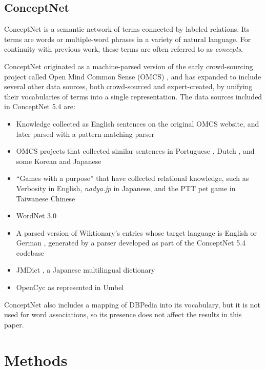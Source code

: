 \documentclass[letterpaper]{article}
\begin{document}
\subsection{ConceptNet}
ConceptNet \cite{speer2012conceptnet} is a semantic network of terms
connected by labeled relations. Its terms are words or multiple-word phrases
in a variety of natural language. For continuity with previous work,
these terms are often referred to as {\em concepts}.

ConceptNet originated as a machine-parsed version of the early crowd-sourcing
project called Open Mind Common Sense (OMCS) \cite{singh2002omcs}, and has expanded
to include several other data sources, both crowd-sourced and expert-created,
by unifying their vocabularies of terms into a single representation.
The data sources included in ConceptNet 5.4 are:

\begin{itemize}
\item Knowledge collected as English sentences on the original OMCS website,
    and later parsed with a pattern-matching parser
\item OMCS projects that collected similar sentences in Portuguese
    \cite{anacleto2006portuguese},
    Dutch \cite{eckhardt2008kid}, and some Korean and Japanese
    \cite{chung2006globalmind}
\item ``Games with a purpose'' that have collected relational knowledge, such as
    Verbosity \cite{vonahn2006verbosity} in English, {\em nadya.jp}
    \cite{nakahara2011nadya} in Japanese, and the PTT pet game \cite{kuo2009petgame}
    in Taiwanese Chinese
\item WordNet 3.0 \cite{miller1998wordnet}
\item A parsed version of Wiktionary's entries whose target language is English or
      German \cite{wiktionary2014en} \cite{wiktionary2014de}, generated
      by a parser developed as part of the ConceptNet 5.4 codebase
\item JMDict \cite{breen2004jmdict}, a Japanese multilingual dictionary
\item OpenCyc \cite{matuszek2006cyc} as represented in Umbel \cite{bergman2008umbel}
\end{itemize}

ConceptNet also includes a mapping of DBPedia \cite{auer2007dbpedia} into
its vocabulary, but it is not used for word associations, so its presence does
not affect the results in this paper.

\section{Methods}
\end{document}
